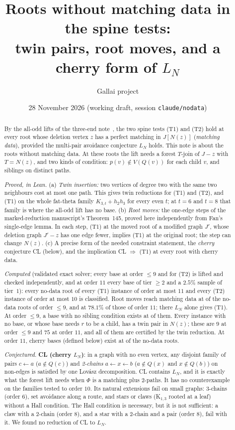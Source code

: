 \documentclass[11pt]{amsart}
\title[Roots without matching data]{Roots without matching data in the spine tests:\\
twin pairs, root moves, and a cherry form of $L_N$}
\author{Gallai project}
\date{28 November 2026 (working draft, session \texttt{claude/nodata})}
\theoremstyle{definition}
\theoremstyle{remark}
\renewcommand{\_}{\oldunderscore\allowbreak}
\begin{document}
\begin{abstract}
By the all-odd lifts of the three-end note~\cite{T2}, the two spine tests (T1) and (T2) hold at
every root whose deletion vertex $z$ has a perfect matching in $J[N(z)]$ (\emph{matching data}),
provided the multi-pair avoidance conjecture $L_N$ holds. This note is about the roots without
matching data. At these roots the lift needs a forest $T$-join of $J-z$ with $T=N(z)$, and two
kinds of condition: $p(v)\notin V(Q(v))$ for each child $v$, and siblings on distinct paths.

\emph{Proved, in Lean.} (a) \emph{Twin insertion:} two vertices of degree two with the same two
neighbours cost at most one path. This gives twin reductions for (T1) and (T2), and (T1) on the
whole fat-theta family $K_{3,t}+h_2h_3$ for every even $t$; at $t=6$ and $t=8$ that family is where
the all-odd lift has no base. (b) \emph{Root moves:} the one-edge steps of the marked-reduction
manuscript's Theorem~145, proved here independently from Fan's single-edge lemma. In each step,
(T1) at the moved root of a modified graph $J'$, whose deletion graph $J'-z$ has one edge fewer,
implies (T1) at the original root; the step can change $N(z)$. (c) A precise form of the needed constraint statement, the \emph{cherry} conjecture CL
(below), and the implication CL $\Rightarrow$ (T1) at every root with cherry data.

\emph{Computed} (validated exact solver; every base at order $\le9$ and for (T2) is lifted and checked
independently, and at order $11$ every base of tier $\ge2$ and a $2.5\%$ sample of tier~$1$): every
no-data root of every (T1) instance of order at most $11$ and every (T2) instance of order at most
$10$ is classified. Root moves reach matching data at \RMNINEREACH{} of the \NDNINE{} no-data
roots of order $\le9$, and at $78.1\%$ of those of order $11$; there $L_N$ alone gives (T1). At
order $\le9$, a base with no sibling condition exists at
\NONSIBNINE{} of them. Every instance with no base, or whose base needs $r$ to be a child, has a
twin pair in $N(z)$; these are $9$ at order $\le9$ and $75$ at order $11$, and all of them are
certified by the twin reduction. At order $11$, cherry bases (defined below) exist at
\TIERONEELEVENPCT{} of the \NDELEVEN{} no-data roots.

\emph{Conjectured.} \textbf{CL (cherry $L_N$)}: in a graph with no even vertex, any disjoint
family of pairs $c\leftarrow a$ ($a\notin Q(c)$) and \emph{2-chains} $a\leftarrow x\leftarrow b$
($a\notin Q(x)$ and $x\notin Q(b)$) on non-edges is satisfied by one Lov\'asz decomposition. CL
contains $L_N$, and it is exactly what the forest lift needs when $\Phi$ is a matching plus
2-paths. It has no counterexample on the families tested to order $10$. Its natural extensions
fail on small graphs: 3-chains (order $6$), set avoidance along a route, and stars or claws
(K$_{1,3}$ rooted at a leaf) without a Hall condition. The Hall condition is necessary, but it is
not sufficient: a claw with a 2-chain (order $8$), and a star with a 2-chain and a pair (order
$8$), fail with it. We found no reduction of CL to $L_N$.
\end{abstract}
\end{document}
